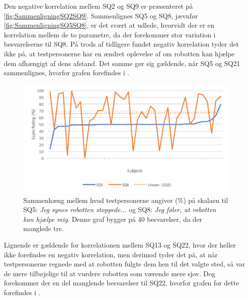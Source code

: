 \noindent
%
Den negative korrelation mellem SQ2 og SQ9 er præsenteret på \autoref{fig:SammenligningSQ2SQ9}. Sammenlignes SQ5 og SQ8, jævnfør \autoref{fig:SammenligningSQ5SQ8}, er det svært at udlede, hvorvidt der er en korrelation mellem de to parametre, da der forekommer stor variation i besvarelserne til SQ8. På trods af tidligere fundet negativ korrelation tyder det ikke på, at testpersonerne har en ændret oplevelse af om robotten kan hjælpe dem afhængigt af dens afstand. Det samme gør sig gældende, når SQ5 og SQ21 sammenlignes, hvorfor grafen forefindes i . 
%
\begin{figure}[H]
	\centering
	\includegraphics[width=\textwidth]{Figure/Korrelationsgrafer/SQ5+SQ8}
	\caption{Sammenhæng mellem hvad testpersonerne angiver (\%) på skalaen til SQ5: \textit{Jeg synes robotten stoppede...} og SQ8: \textit{Jeg føler, at robotten kan hjælpe mig}. Denne graf bygger på 40 besvarelser, da der manglede tre.}
	\label{fig:SammenligningSQ5SQ8}
\end{figure}
\noindent
%
Lignende er gældende for korrelationen mellem SQ13 og SQ22, hvor der heller ikke forefindes en negativ korrelation, men derimod tyder det på, at når testpersonerne regnede med at robotten fulgte dem hen til det valgte sted, så var de mere tilbøjelige til at vurdere robotten som værende mere sjov. Dog forekommer der en del manglende besvarelser til SQ22, hvorfor grafen for dette forefindes i . 

